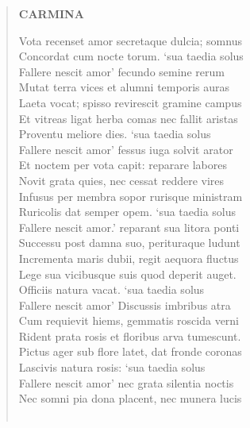 \documentclass[11pt, a4paper]{report}
\begin{document}
\begin{verse}
    \begin{center} \textbf{CARMINA} \end{center} \marginpar{[116]} Vota recenset amor secretaque dulcia; somnus \\ Concordat cum nocte torum. ‘sua taedia solus \\ Fallere nescit amor’ fecundo semine rerum \\ Mutat terra vices et alumni temporis auras \\ Laeta vocat; spisso revirescit gramine campus \\ Et vitreas ligat herba comas nec fallit aristas \\ Proventu meliore dies. ‘sua taedia solus \\ Fallere nescit amor’ fessus iuga solvit arator \\ Et noctem per vota capit: reparare labores \\ Novit grata quies, nec cessat reddere vires \\ Infusus per membra sopor rurisque ministram \\ Ruricolis dat semper opem. ‘sua taedia solus \\ Fallere nescit amor.’ reparant sua litora ponti \\ Successu post damna suo, perituraque ludunt \\ Incrementa maris dubii, regit aequora fluctus \\ Lege sua vicibusque suis quod deperit auget. \\ Officiis natura vacat. ‘sua taedia solus \\ Fallere nescit amor’  \lbrack Discussis imbribus atra \\ Cum requievit hiems, \rbrack  gemmatis roscida verni \\ Rident prata rosis et floribus arva tumescunt. \\ Pictus ager sub flore latet, dat fronde coronas \\ Lascivis natura rosis: ‘sua taedia solus \\ Fallere nescit amor’ nec grata silentia noctis \\ Nec somni pia dona placent, nec munera lucis \\ 
        ﻿\pagebreak 

\end{verse}
\end{document}

